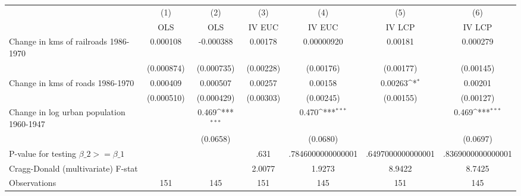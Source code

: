 {
\def\sym#1{\ifmmode^{#1}\else\(^{#1}\)\fi}
\begin{tabular}{l*{6}{c}}
\hline\hline
                &\multicolumn{1}{c}{(1)}&\multicolumn{1}{c}{(2)}&\multicolumn{1}{c}{(3)}&\multicolumn{1}{c}{(4)}&\multicolumn{1}{c}{(5)}&\multicolumn{1}{c}{(6)}\\
                &\multicolumn{1}{c}{OLS}&\multicolumn{1}{c}{OLS}&\multicolumn{1}{c}{IV EUC}&\multicolumn{1}{c}{IV EUC}&\multicolumn{1}{c}{IV LCP}&\multicolumn{1}{c}{IV LCP}\\
\hline
Change in kms of railroads 1986-1970& 0.000108         &-0.000388         &  0.00178         &0.00000920         &  0.00181         & 0.000279         \\
                &(0.000874)         &(0.000735)         &(0.00228)         &(0.00176)         &(0.00177)         &(0.00145)         \\
[1em]
Change in kms of roads 1986-1970& 0.000409         & 0.000507         &  0.00257         &  0.00158         &  0.00263\sym{*}  &  0.00201         \\
                &(0.000510)         &(0.000429)         &(0.00303)         &(0.00245)         &(0.00155)         &(0.00127)         \\
[1em]
Change in log urban population 1960-1947&                  &    0.469\sym{***}&                  &    0.470\sym{***}&                  &    0.469\sym{***}\\
                &                  & (0.0658)         &                  & (0.0680)         &                  & (0.0697)         \\
\hline
P-value for testing $\beta\_{2} >= \beta\_{1}$&                  &                  &     .631         &.7846000000000001         &.6497000000000001         &.8369000000000001         \\
Cragg-Donald (multivariate) F-stat&                  &                  &   2.0077         &   1.9273         &   8.9422         &   8.7425         \\
Observations    &      151         &      145         &      151         &      145         &      151         &      145         \\
\hline\hline
\end{tabular}
}
